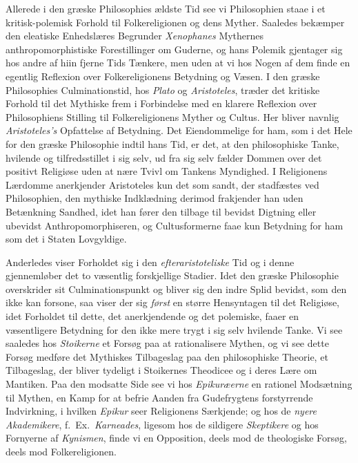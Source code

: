 \documentclass[12pt,a4paper]{book}
\newcommand{\opage}[1]{\marginnote{\footnotesize\textit{[#1]}}}
\begin{document}
Allerede i den græske Philosophies ældste Tid see vi Philosophien staae
i et kritisk-polemisk Forhold til Folkereligionen og dens Myther.
Saaledes bekæmper den eleatiske Enhedslæres Begrunder \emph{Xenophanes}
Mythernes anthropomorphistiske Forestillinger om Guderne, og hans
Polemik gjentager sig hos andre af hiin fjerne Tids Tænkere, men uden
at vi hos Nogen af dem finde en egentlig Reflexion over
Folkereligionens Betydning og Væsen. I den græske Philosophies
Culminationstid, hos \emph{Plato} og \emph{Aristoteles}, træder det kritiske Forhold
til det Mythiske frem i Forbindelse med en klarere Reflexion over
Philosophiens Stilling til Folkereligionens Myther og Cultus. Her
bliver navnlig \emph{Aristoteles's} Opfattelse af Betydning. Det
Eiendommelige for ham, som i det Hele for den græske Philosophie
indtil hans Tid, er det, at den philosophiske Tanke, hvilende og
tilfredsstillet i sig selv, ud fra sig selv fælder Dommen over det
positivt Religiøse uden at nære Tvivl om Tankens Myndighed. I
Religionens Lærdomme anerkjender Aristoteles kun det som sandt, der
stadfæstes ved Philosophien, den mythiske Indklædning derimod
frakjender han uden Betænkning Sandhed, idet han fører den tilbage til
bevidst Digtning eller ubevidst Anthropomorphiseren, og Cultusformerne
faae kun Betydning for ham som det i Staten Lovgyldige.

Anderledes viser Forholdet sig i den \emph{efteraristoteliske} Tid og i denne
gjennemløber det to væsentlig forskjellige Stadier. Idet den græske
Philosophie overskrider sit Culminationspunkt og bliver sig den indre
Splid bevidst, \opage{10}som den ikke kan forsone, saa viser der sig \emph{først} en
større Hensyntagen til det Religiøse, idet Forholdet til dette, det
anerkjendende og det polemiske, faaer en væsentligere Betydning for den
ikke mere trygt i sig selv hvilende Tanke. Vi see saaledes hos \emph{Stoikerne} et Forsøg paa at rationalisere Mythen, og vi see dette
Forsøg medføre det Mythiskes Tilbageslag paa den philosophiske
Theorie, et Tilbageslag, der bliver tydeligt i Stoikernes Theodicee og
i deres Lære om Mantiken. Paa den modsatte Side see vi hos \emph{Epikuræerne}
en rationel Modsætning til Mythen, en Kamp for at befrie Aanden fra
Gudefrygtens forstyrrende Indvirkning, i hvilken \emph{Epikur} seer
Religionens Særkjende; og hos de \emph{nyere Akademikere}, f.~Ex.\ \emph{Karneades},
ligesom hos de sildigere \emph{Skeptikere} og hos Fornyerne af \emph{Kynismen},
finde vi en Opposition, deels mod de theologiske Forsøg, deels mod
Folkereligionen.
\end{document}
